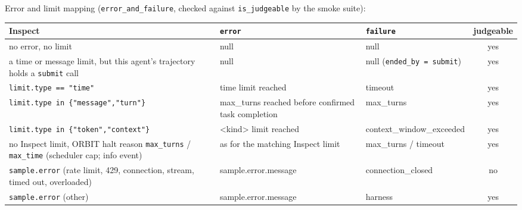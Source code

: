 \documentclass[10pt,a4paper]{article}
\newcommand{\code}[1]{\texttt{#1}}
\begin{document}
Error and limit mapping (\code{error_and_failure}, checked against \code{is_judgeable} by the smoke suite):\par\smallskip
\begin{xltabular}{\textwidth}{>{\raggedright\arraybackslash}p{4.0cm}>{\ttfamily\footnotesize\raggedright\arraybackslash}p{3.8cm}>{\ttfamily\footnotesize}p{3.6cm}c}
\toprule
Inspect & \normalfont\code{error} & \normalfont\code{failure} & judgeable \\
\midrule
no error, no limit & null & null & yes \\
a time or message limit, but this agent's trajectory holds a \code{submit} call & null & null (\code{ended_by = submit}) & yes \\
\code{limit.type == "time"} & time limit reached & timeout & yes \\
\code{limit.type in \{"message","turn"\}} & max_turns reached before confirmed task completion & max_turns & yes \\
\code{limit.type in \{"token","context"\}} & <kind> limit reached & context_window_exceeded & yes \\
no Inspect limit, ORBIT halt reason \code{max_turns} / \code{max_time} (scheduler cap; info event) & as for the matching Inspect limit & max_turns / timeout & yes \\
\code{sample.error} (rate limit, 429, connection, stream, timed out, overloaded) & sample.error.message & connection_closed & no \\
\code{sample.error} (other) & sample.error.message & harness & yes \\
\bottomrule
\end{xltabular}
\end{document}
